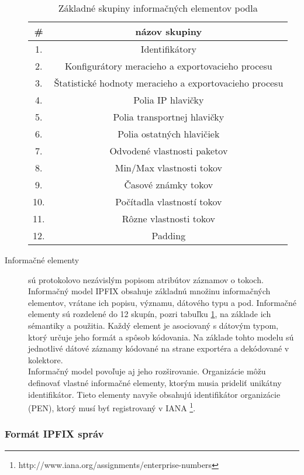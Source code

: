 \begin{description}
\tabcolsep=8pt
\begin{table}[!ht]\caption{Základné skupiny informačných elementov podla \citep{rfc5102}}\label{t:ie-table}
\smallskip
\centering
\begin{tabular}{|c|c|}
\hline
\textbf{\#} & \textbf{názov skupiny} \\ \hline
1. & Identifikátory \\ \hline
2. & Konfigurátory meracieho a exportovacieho procesu \\ \hline
3. & Štatistické hodnoty meracieho a exportovacieho procesu \\ \hline
4. & Polia IP hlavičky \\ \hline
5. & Polia transportnej hlavičky \\ \hline
6. & Polia ostatných hlavičiek \\ \hline
7. & Odvodené vlastnosti paketov \\ \hline
8. & Min/Max vlastnosti tokov \\ \hline
9. & Časové známky tokov \\ \hline
10. & Počítadla vlastností tokov \\ \hline
11. & Rôzne vlastnosti tokov \\ \hline
12. & Padding \\ \hline
\end{tabular}
\end{table}

  \item[Informačné elementy] sú protokolovo nezávislým popisom atribútov záznamov o tokoch. 
Informačný model IPFIX \citep{rfc5102} obsahuje základnú množinu informačných elementov, vrátane ich
popisu, významu, dátového typu a pod. Informačné elementy sú rozdelené do 12 skupín, pozri tabuľku \ref{t:ie-table},
na základe ich sémantiky a použitia. Každý element je asociovaný s dátovým typom, ktorý určuje jeho 
formát a spôsob kódovania.
Na základe tohto modelu sú jednotlivé dátové záznamy kódované na strane exportéra a dekódované 
v kolektore.\\
Informačný model povoľuje aj jeho rozširovanie. Organizácie môžu definovať vlastné informačné
elementy, ktorým musia prideliť unikátny identifikátor. 
Tieto elementy navyše obsahujú identifikátor organizácie (PEN), ktorý musí byť registrovaný v IANA
\footnote{http://www.iana.org/assignments/enterprise-numbers}.
\end{description}

\subsubsection{Formát IPFIX správ} \label{sec:message_format}

